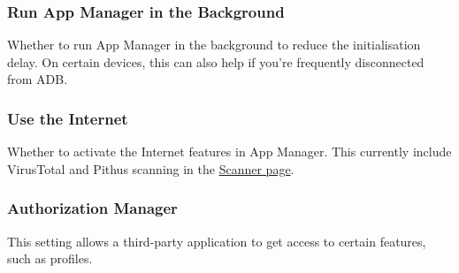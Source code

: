 \subsubsection{Run App Manager in the Background}\label{subsubsec:run-am-in-background} %
Whether to run App Manager in the background to reduce the initialisation delay. On certain devices,
this can also help if you're frequently disconnected from ADB\@.

\subsubsection{Use the Internet}\label{subsubsec:use-the-internet} %
Whether to activate the Internet features in App Manager. This currently include VirusTotal and
Pithus scanning in the \hyperref[sec:scanner-page]{Scanner page}.

\subsubsection{Authorization Manager}\label{subsubsec:auth-manager} %
This setting allows a third-party application to get access to certain features, such as profiles.

